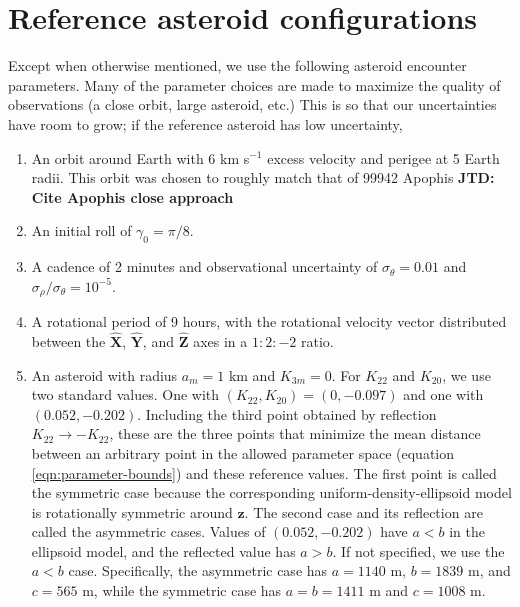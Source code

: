 \documentclass[fleqn,usenatbib]{mnras}
\newcommand{\jtd}[1]{ {\bf{\color{red} JTD: #1}} }
\newcommand{\unit}[1]{\bm{\hat{#1}}}
\begin{document}


\appendix

\section{Reference asteroid configurations}
\label{app:reference-configs}

Except when otherwise mentioned, we use the following asteroid encounter parameters. Many of the parameter choices are made to maximize the quality of observations (a close orbit, large asteroid, etc.) This is so that our uncertainties have room to grow; if the reference asteroid has low uncertainty,

\begin{enumerate}
  \item An orbit around Earth with $6$ km s$^{-1}$ excess velocity and perigee at 5 Earth radii. This orbit was chosen to roughly match that of 99942 Apophis \jtd{Cite Apophis close approach}
  \item An initial roll of $\gamma_0=\pi/8$.
  \item A cadence of 2 minutes and observational uncertainty of $\sigma_\theta = 0.01$ and $\sigma_\rho / \sigma_\theta = 10^{-5}$.
  \item A rotational period of 9 hours, with the rotational velocity vector distributed between the $\unit X$, $\unit Y$, and $\unit Z$ axes in a $1:2:-2$ ratio.
  \item An asteroid with radius $a_m = 1$ km and $K_{3m}=0$. For $K_{22}$ and $K_{20}$, we use two standard values. One with $(K_{22}, K_{20}) = (0, -0.097)$ and one with $(0.052, -0.202)$. Including the third point obtained by reflection $K_{22}\rightarrow -K_{22}$, these are the three points that minimize the mean distance between an arbitrary point in the allowed parameter space (equation \ref{eqn:parameter-bounds}) and these reference values. The first point is called the symmetric case because the corresponding uniform-density-ellipsoid model is rotationally symmetric around $\unit z$. The second case and its reflection are called the asymmetric cases. Values of $(0.052, -0.202)$ have $a < b$ in the ellipsoid model, and the reflected value has $a > b$. If not specified, we use the $a < b$ case. Specifically, the asymmetric case has $a=1140$ m, $b=1839$ m, and $c=565$ m, while the symmetric case has $a=b=1411$ m and $c=1008$ m.
\end{enumerate}
\end{document}

